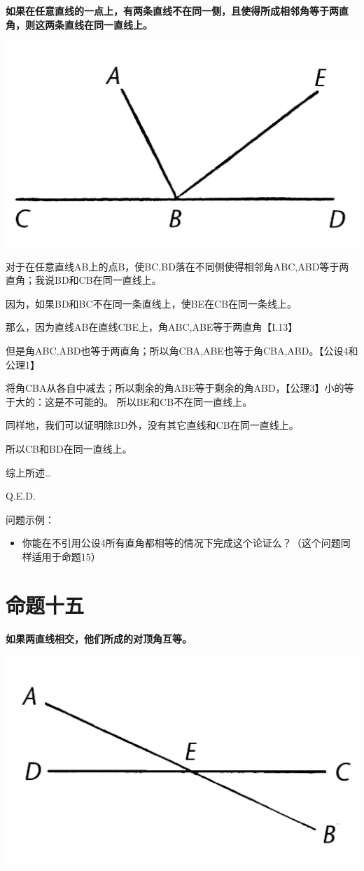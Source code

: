 \documentclass[
]{book}
\providecommand{\tightlist}{%
  \setlength{\itemsep}{0pt}\setlength{\parskip}{0pt}}
\begin{document}
\textbf{如果在任意直线的一点上，有两条直线不在同一侧，且使得所成相邻角等于两直角，则这两条直线在同一直线上。}

\includegraphics[width=0.4\linewidth]{./image/img477}

对于在任意直线AB上的点B，使BC,BD落在不同侧使得相邻角ABC,ABD等于两直角；我说BD和CB在同一直线上。

因为，如果BD和BC不在同一条直线上，使BE在CB在同一条线上。

那么，因为直线AB在直线CBE上，角ABC,ABE等于两直角【I.13】

但是角ABC,ABD也等于两直角；所以角CBA,ABE也等于角CBA,ABD。【公设4和公理1】

将角CBA从各自中减去；所以剩余的角ABE等于剩余的角ABD，【公理3】小的等于大的：这是不可能的。
所以BE和CB不在同一直线上。

同样地，我们可以证明除BD外，没有其它直线和CB在同一直线上。

所以CB和BD在同一直线上。

综上所述\ldots{}

Q.E.D.

问题示例：

\begin{itemize}
\tightlist
\item
  你能在不引用公设4所有直角都相等的情况下完成这个论证么？（这个问题同样适用于命题15）
\end{itemize}

\hypertarget{ux547dux9898ux5341ux4e94}{%
\section{命题十五}\label{ux547dux9898ux5341ux4e94}}

\textbf{如果两直线相交，他们所成的对顶角互等。}

\includegraphics[width=0.4\linewidth]{./image/img479}
\end{document}
